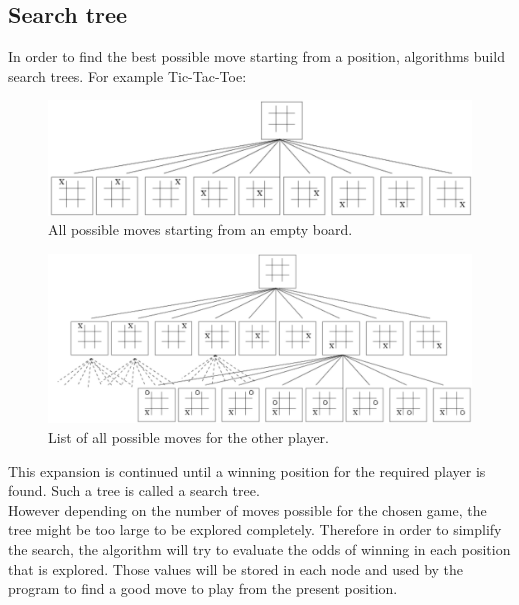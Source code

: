 \subsection{Search tree}
\label{trees}
In order to find the best possible move starting from a position, algorithms build search trees. 
For example Tic-Tac-Toe: \cite{images_annexes}
\begin{figure}[H]
	\centering
	\includegraphics[width=15cm]{5_Annexes/img/Tree1.png}
	\caption{\label{fig:tree1}All possible moves starting from an empty board.}
\end{figure}
\noindent
\begin{figure}[H]
	\centering
	\includegraphics[width=15cm]{5_Annexes/img/Tree2.png}
	\caption{\label{fig:tree2}List of all possible moves for the other player.}
\end{figure}

This expansion is continued until a winning position for the required player is found. Such a tree is called a search tree.
\bigskip\\
However depending on the number of moves possible for the chosen game, the tree might be too large to be explored completely. Therefore in order to simplify the search, the algorithm will try to evaluate the odds of winning in each position that is explored. Those values will be stored in each node and used by the program to find a good move to play from the present position.